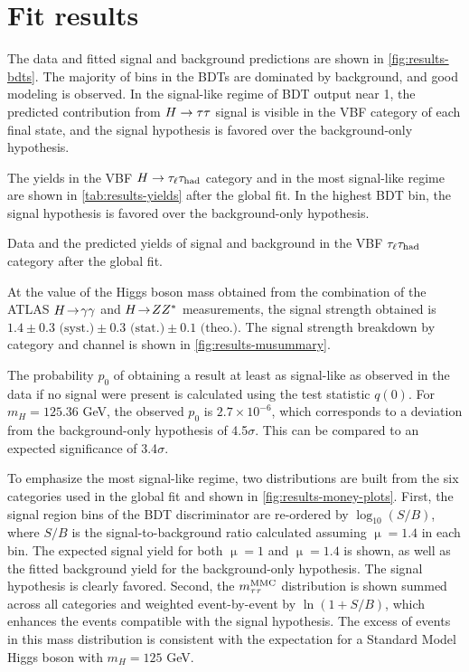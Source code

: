 \section{Fit results}
\label{sec:results-fit-results}

The data and fitted signal and background predictions are shown in \cref{fig:results-bdts}. The majority of bins in the BDTs are dominated by background, and good modeling is observed. In the signal-like regime of BDT output near 1, the predicted contribution from $H\rightarrow\tau\tau$ signal is visible in the VBF category of each final state, and the signal hypothesis is favored over the background-only hypothesis.

The yields in the VBF $H\rightarrow\tau_\ell\tau_\text{had}$ category and in the most signal-like regime are shown in \cref{tab:results-yields} after the global fit. In the highest BDT bin, the signal hypothesis is favored over the background-only hypothesis.

\begin{table}[bp] 
  \centering
  \renewcommand{\arraystretch}{1.4}
  \caption{Data and the predicted yields of signal and background in the VBF $\tau_\ell\tau_\text{had}$ category after the global fit.}
  
  \label{tab:results-yields}
\end{table}

At the value of the Higgs boson mass obtained from the combination of the ATLAS $H \!\rightarrow\! \gamma\gamma$ and $H \!\rightarrow\! ZZ^\ast$ measurements, the signal strength obtained is $1.4 \pm 0.3 \text{ (syst.)} \pm 0.3 \text{ (stat.)} \pm 0.1 \text{ (theo.)}$. The signal strength breakdown by category and channel is shown in \cref{fig:results-musummary}.

The probability $p_0$ of obtaining a result at least as signal-like as observed in the data if no signal were present is calculated using the test statistic $q(0)$. For $m_H = 125.36$ GeV, the observed $p_0$ is $2.7 \times 10^{-6}$, which corresponds to a deviation from the background-only hypothesis of 4.5$\sigma$.  This can be compared to an expected significance of 3.4$\sigma$.

To emphasize the most signal-like regime, two distributions are built from the six categories used in the global fit and shown in \cref{fig:results-money-plots}. First, the signal region bins of the BDT discriminator are re-ordered by $\log_{10}(S/B)$, where $S/B$ is the signal-to-background ratio calculated assuming $\upmu=1.4$ in each bin. The expected signal yield for both $\upmu=1$ and $\upmu=1.4$ is shown, as well as the fitted background yield for the background-only hypothesis. The signal hypothesis is clearly favored. Second, the $m_{\tau\tau}^\text{MMC}$ distribution is shown summed across all categories and weighted event-by-event by $\ln(1+S/B)$, which enhances the events compatible with the signal hypothesis. The excess of events in this mass distribution is consistent with the expectation for a Standard Model Higgs boson with $m_H = 125$ GeV.


